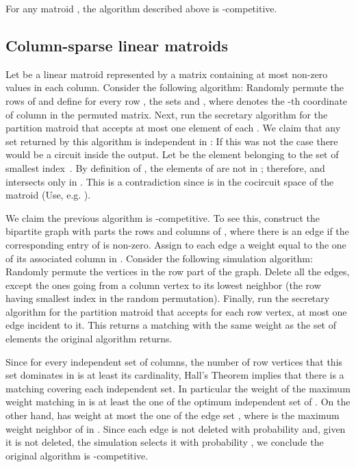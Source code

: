 \documentclass[letterpaper,11pt]{article}
\theoremstyle{definition}
\theoremstyle{remark}
\begin{document}
\begin{thm} For any matroid , the algorithm described above is -competitive.
\end{thm}
\subsection{Column-sparse linear matroids}
Let  be a linear matroid represented by a matrix  containing at most  non-zero values in each column.
Consider the following algorithm: Randomly permute the rows of  and define for every row , the sets  and , where  denotes the -th coordinate of column  in the permuted matrix. Next, run the secretary algorithm for the partition matroid that accepts at most one element of each . We claim that any set returned by this algorithm is independent in : If this was not the case there would be a circuit  inside the output. Let  be the element belonging to the set  of smallest index~. By definition of , the elements of  are not in ; therefore,  and  intersects only in . This is a contradiction since  is in the cocircuit space of the matroid (Use, e.g. \cite[Proposition 2.1.11]{oxley2006matroid}).

We claim the previous algorithm is -competitive. To see this, construct the bipartite graph  with parts the rows and columns of , where there is an edge  if the corresponding entry of  is non-zero. Assign to each edge a weight equal to the one of its associated column in . Consider the following simulation algorithm: Randomly permute the vertices in the row part of the graph. Delete all the edges, except the ones going from a column vertex to its lowest neighbor (the row having smallest index in the random permutation). Finally, run the secretary algorithm for the partition matroid that accepts for each row vertex, at most one edge incident to it. This returns a matching with the same weight as the set of elements the original algorithm returns.

Since for every independent set of columns, the number of row vertices that this set dominates in  is at least its cardinality, Hall's Theorem implies that there is a matching covering each independent set. In particular the weight of the maximum weight matching  in  is at least the one of the optimum independent set of . On the other hand,  has weight at most the one of the edge set , where  is the maximum weight neighbor of  in . Since each edge  is not deleted with probability   and, given it is not deleted, the simulation selects it with probability , we conclude the original algorithm is -competitive.
\end{document}
